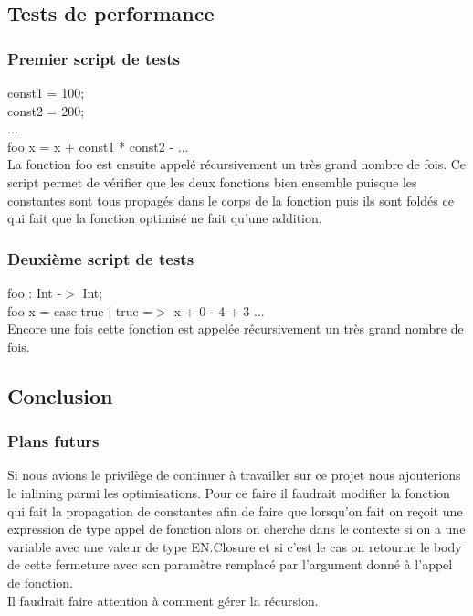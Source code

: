 \documentclass{beamer}
\begin{document}
\subsection{Tests de performance}
\begin{frame}
    \frametitle{Premier script de tests}
    const1 = 100;\\
    const2 = 200;\\
    ...\\
    \bigskip
    foo x = x + const1 * const2 - ...\\
    \bigskip
    La fonction foo est ensuite appelé récursivement un très grand nombre de fois. Ce script permet de vérifier que les
    deux fonctions bien ensemble puisque les constantes sont tous propagés dans le corps de la fonction puis ils sont
    foldés ce qui fait que la fonction optimisé ne fait qu'une addition.

\end{frame}
\begin{frame}
    \frametitle{Deuxième script de tests}
    foo : Int -$>$ Int;\\
    foo x = case true
        $|$ true =$>$ x + 0 - 4 + 3 ...\\
    \bigskip
    Encore une fois cette fonction est appelée récursivement un très grand
    nombre de fois.

\end{frame}
\subsection{Conclusion}
\begin{frame}
    \frametitle{Plans futurs}

    Si nous avions le privilège de continuer à travailler sur ce projet nous
    ajouterions le inlining parmi les optimisations. Pour ce faire il faudrait
    modifier la fonction qui fait la propagation de constantes afin de faire
    que lorsqu'on fait on reçoit une expression de type appel de fonction alors
    on cherche dans le contexte si on a une variable avec une valeur de type 
    EN.Closure et si c'est le cas on retourne le body de cette fermeture avec
    son paramètre remplacé par l'argument donné à l'appel de fonction.\\
    \bigskip
    Il faudrait faire attention à comment gérer la récursion.
\end{frame}
\end{document}
